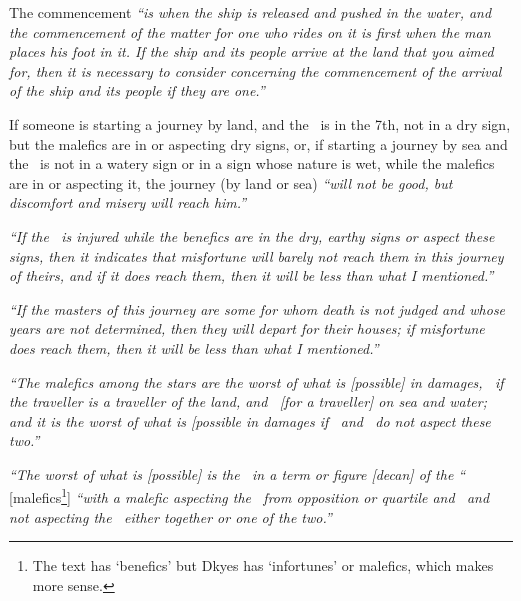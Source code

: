 The commencement \textsl{``is when the ship is released and pushed in the water, and the commencement of the matter for one who rides on it is first when the man places his foot in it. If the ship and its people arrive at the land that you aimed for, then it is necessary to consider concerning the commencement of the arrival of the ship and its people if they are one.''}

If someone is starting a journey by land, and the \Moon\, is in the 7th, not in a dry sign, but the malefics are in or aspecting dry signs, or, if starting a journey by sea and the \Moon\, is not in a watery sign or in a sign whose nature is wet, while the malefics are in or aspecting it, the journey (by land or sea) \textsl{``will not be good, but discomfort and misery will reach him.''}

\textsl{``If the \Moon\, is injured while the benefics are in the dry, earthy signs or aspect these signs, then it indicates that misfortune will barely not reach them in this journey of theirs, and if it does reach them, then it will be less than what I mentioned.''}

\textsl{``If the masters of this journey are some for whom death is not judged and whose years are not determined, then they will depart for their houses; if misfortune does reach them, then it will be less than what I mentioned.''}

\textsl{``The malefics among the stars are the worst of what is [possible] in damages, \Mars\, if the traveller is a traveller of the land, and \Saturn\, [for a traveller] on sea and water; and it is the worst of what is [possible in damages if \Jupiter\, and \Venus\, do not aspect these two.''}

\textsl{``The worst of what is [possible] is the \Moon\, in a term or figure [decan] of the ``} [malefics\footnote{The text has `benefics' but Dkyes has `infortunes' or malefics, which makes more sense.}] \textsl{``with a malefic aspecting the \Moon\, from opposition or quartile and \Jupiter\, and \Venus\, not aspecting the \Moon\, either together or one of the two.''}













